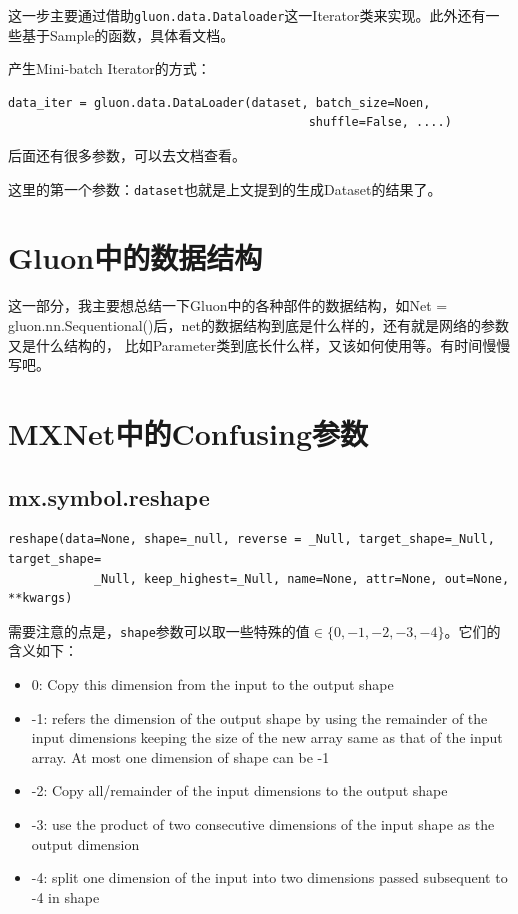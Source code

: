 这一步主要通过借助\verb|gluon.data.Dataloader|这一Iterator类来实现。此外还有一些基于Sample的函数，具体看文档。

产生Mini-batch Iterator的方式：

\begin{verbatim}
data_iter = gluon.data.DataLoader(dataset, batch_size=Noen,  
                                          shuffle=False, ....)
\end{verbatim}

后面还有很多参数，可以去文档查看。

这里的第一个参数：\verb|dataset|也就是上文提到的生成Dataset的结果了。

\section{Gluon中的数据结构}

这一部分，我主要想总结一下Gluon中的各种部件的数据结构，如Net = gluon.nn.Sequentional()后，net的数据结构到底是什么样的，还有就是网络的参数又是什么结构的， 比如Parameter类到底长什么样，又该如何使用等。有时间慢慢写吧。

\section{MXNet中的Confusing参数}

\subsection{mx.symbol.reshape}

\begin{verbatim}
reshape(data=None, shape=_null, reverse = _Null, target_shape=_Null, target_shape=
            _Null, keep_highest=_Null, name=None, attr=None, out=None, **kwargs)
\end{verbatim}

需要注意的点是，\verb|shape|参数可以取一些特殊的值$\in \{0, -1, -2, -3, -4\}$。它们的含义如下：
\begin{itemize}
\item 0: Copy this dimension from the input to the output shape
\item -1: refers the dimension of the output shape by using the remainder of the input dimensions keeping the size of the new array same as that of the input array. At most one dimension of shape can be -1
\item -2: Copy all/remainder of the input dimensions to the output shape
\item -3: use the product of two consecutive dimensions of the input shape as the output dimension
\item -4: split one dimension of the input into two dimensions passed subsequent to -4 in shape
\end{itemize}


